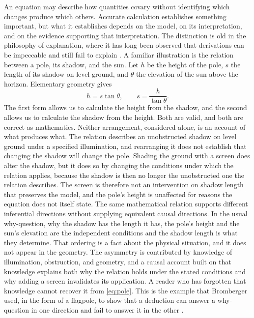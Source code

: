 \documentclass[11pt,letterpaper]{article}
\theoremstyle{definition}
\begin{document}
An equation may describe how quantities covary without identifying which changes produce which others. Accurate calculation establishes something important, but what it establishes depends on the model, on its interpretation, and on the evidence supporting that interpretation. The distinction is old in the philosophy of explanation, where it has long been observed that derivations can be impeccable and still fail to explain \cite{hempel1965,salmon1984}. A familiar illustration is the relation between a pole, its shadow, and the sun. Let $h$ be the height of the pole, $s$ the length of its shadow on level ground, and $\theta$ the elevation of the sun above the horizon. Elementary geometry gives
\begin{equation}
  h = s \tan\theta,
  \qquad
  s = \frac{h}{\tan\theta}.
  \label{eq:pole}
\end{equation}
The first form allows us to calculate the height from the shadow, and the second allows us to calculate the shadow from the height. Both are valid, and both are correct as mathematics. Neither arrangement, considered alone, is an account of what produces what. The relation describes an unobstructed shadow on level ground under a specified illumination, and rearranging it does not establish that changing the shadow will change the pole. Shading the ground with a screen does alter the shadow, but it does so by changing the conditions under which the relation applies, because the shadow is then no longer the unobstructed one the relation describes. The screen is therefore not an intervention on shadow length that preserves the model, and the pole's height is unaffected for reasons the equation does not itself state. The same mathematical relation supports different inferential directions without supplying equivalent causal directions. In the usual why-question, why the shadow has the length it has, the pole's height and the sun's elevation are the independent conditions and the shadow length is what they determine. That ordering is a fact about the physical situation, and it does not appear in the geometry. The asymmetry is contributed by knowledge of illumination, obstruction, and geometry, and a causal account built on that knowledge explains both why the relation holds under the stated conditions and why adding a screen invalidates its application. A reader who has forgotten that knowledge cannot recover it from \eqref{eq:pole}. This is the example that Bromberger used, in the form of a flagpole, to show that a deduction can answer a why-question in one direction and fail to answer it in the other \cite{bromberger1966}.
\end{document}
